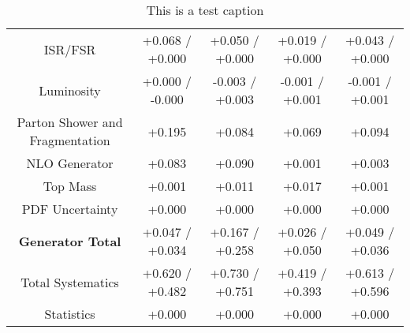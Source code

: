 \begin{table}[htbp]
\begin{center}
\begin{tabular}{|c|c|c|c|c|}
ISR/FSR                               &+0.068   / +0.000   & +0.050   / +0.000   & +0.019   / +0.000   & +0.043   / +0.000  \\
Luminosity                            &+0.000   / -0.000   & -0.003   / +0.003   & -0.001   / +0.001   & -0.001   / +0.001  \\
Parton Shower and Fragmentation       &+0.195              & +0.084              & +0.069              & +0.094             \\
NLO Generator                         &+0.083              & +0.090              & +0.001              & +0.003             \\
Top Mass                              &+0.001              & +0.011              & +0.017              & +0.001             \\
PDF Uncertainty                       &+0.000              & +0.000              & +0.000              & +0.000             \\
\hline
\textbf{Generator Total}              &+0.047   / +0.034   & +0.167   / +0.258   & +0.026   / +0.050   & +0.049   / +0.036  \\
\hline
\hline
Total Systematics                     &+0.620   / +0.482   & +0.730   / +0.751   & +0.419   / +0.393   & +0.613   / +0.596  \\
Statistics                            &+0.000              & +0.000              & +0.000              & +0.000             \\
\hline
  \end{tabular}
  \end{center} 
  \label{tab:fsm_nominal_coscos_op_low}
  \caption{This is a test caption}
\end{table}

